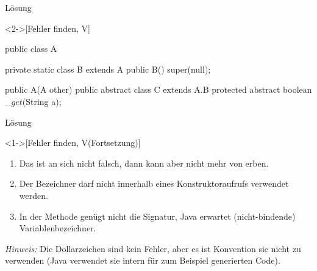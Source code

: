 \begin{frame}[c,fragile]{Lösung}
    \begin{solve}<2->[Fehler finden, V]
        \pause{}\footnotesize\begin{plainjava}
public class A {
    private static class B extends A {
        public B() {
            super(null);
        }
    }

    public A(A other){}
    public abstract class C extends A.B {
        protected abstract boolean _$get$(String a);
    }
}
        \end{plainjava}
    \end{solve}
\end{frame}

\begin{frame}[c]{Lösung}
    \addtocounter{solve}{-1}
    \begin{solve}<1->[Fehler finden, V\hfill{}(Fortsetzung)]
        \begin{enumerate}
            \item Das  ist an sich nicht falsch, dann kann aber  nicht mehr von  erben.
            \item Der Bezeichner  darf nicht innerhalb eines Konstruktoraufrufs verwendet werden.
            \item In der Methode  genügt nicht die Signatur,\pause{} Java erwartet (nicht-bindende) Variablenbezeichner.
        \end{enumerate}
        \pause{}\textit{Hinweis:}\pause{} Die Dollarzeichen sind kein Fehler,\pause{} aber es ist Konvention sie nicht zu verwenden (Java verwendet sie intern für zum Beispiel generierten Code).
    \end{solve}
\end{frame}
\fi